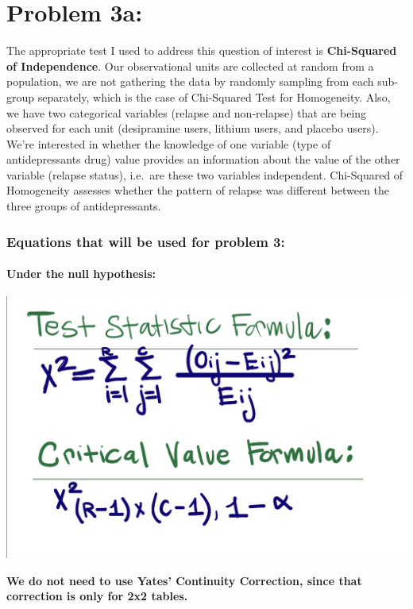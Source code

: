 \documentclass[
]{article}
\begin{document}
\newpage

\hypertarget{problem-3a}{%
\section{Problem 3a:}\label{problem-3a}}

The appropriate test I used to address this question of interest is
\textbf{Chi-Squared of Independence}. Our observational units are
collected at random from a population, we are not gathering the data by
randomly sampling from each sub-group separately, which is the case of
Chi-Squared Test for Homogeneity. Also, we have two categorical
variables (relapse and non-relapse) that are being observed for each
unit (desipramine users, lithium users, and placebo users). We're
interested in whether the knowledge of one variable (type of
antidepressants drug) value provides an information about the value of
the other variable (relapse status), i.e.~are these two variables
independent. Chi-Squared of Homogeneity assesses whether the pattern of
relapse was different between the three groups of antidepressants.

\hypertarget{equations-that-will-be-used-for-problem-3}{%
\subsubsection{Equations that will be used for problem
3:}\label{equations-that-will-be-used-for-problem-3}}

\hypertarget{under-the-null-hypothesis}{%
\paragraph{Under the null hypothesis:}\label{under-the-null-hypothesis}}

\begin{center}\includegraphics[width=0.5\linewidth]{problem3eq} \end{center}

\textbf{We do not need to use Yates' Continuity Correction, since that
correction is only for 2x2 tables.}
\end{document}
